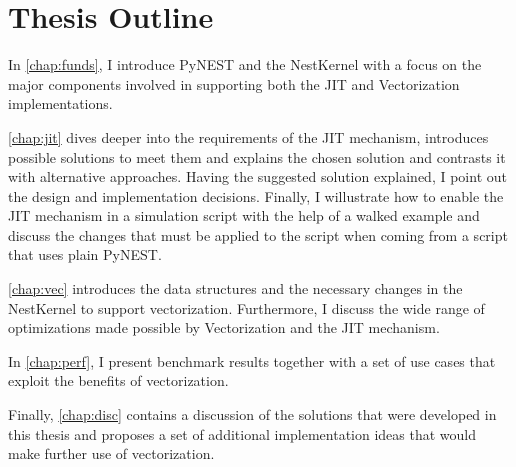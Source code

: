 \section{Thesis Outline}

In \autoref{chap:funds}, I introduce PyNEST and the NestKernel with a focus on the major components involved in supporting both the JIT and Vectorization implementations.

\autoref{chap:jit} dives deeper into the requirements of the JIT mechanism, introduces possible solutions to meet them and explains the chosen solution and contrasts it with alternative approaches. Having the suggested solution explained, I point out the design and implementation decisions. Finally, I willustrate how to enable the JIT mechanism in a simulation script with the help of a walked example and discuss the changes that must be applied to the script when coming from a script that uses plain PyNEST.

\autoref{chap:vec} introduces the data structures and the necessary changes in the NestKernel to support vectorization. Furthermore, I discuss the wide range of optimizations made possible by Vectorization and the JIT mechanism.

In \autoref{chap:perf}, I present benchmark results together with a set of use cases that exploit the benefits of vectorization.

Finally, \autoref{chap:disc} contains a discussion of the solutions that were developed in this thesis and proposes a set of additional implementation ideas that would make further use of vectorization.

\cleardoublepage
